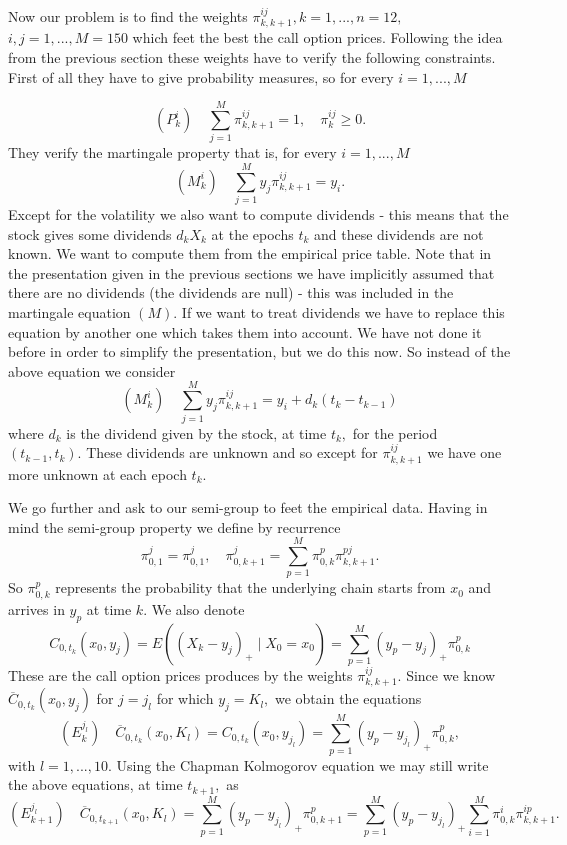 \documentclass[a4paper]{article}
\begin{document}
Now our problem is to find the weights $\pi _{k,k+1}^{ij},k=1,...,n=12,$ $%
i,j=1,...,M=150$ which feet the best the call option prices. Following the
idea from the previous section these weights have to verify the following
constraints. First of all they have to give probability measures, so for
every $i=1,...,M$

\[
(P_{k}^{i})\quad \sum_{j=1}^{M}\pi _{k,k+1}^{ij}=1,\quad \pi _{k}^{ij}\geq
0.
\]
They verify the martingale property that is, for every $i=1,...,M$%
\[
(M_{k}^{i})\quad \sum_{j=1}^{M}y_{j}\pi _{k,k+1}^{ij}=y_{i}.
\]
Except for the volatility we also want to compute dividends - this means
that the stock gives some dividends $d_{k}X_{k}$ at the epochs $t_{k}$ and
these dividends are not known. We want to compute them from the empirical
price table. Note that in the presentation given in the previous sections we
have implicitly assumed that there are no dividends (the dividends are null)
- this was included in the martingale equation $(M).$ If we want to treat
dividends we have to replace this equation by another one which takes them
into account. We have not done it before in order to simplify the
presentation, but we do this now. So instead of the above equation we
consider
\[
(M_{k}^{i})\quad \sum_{j=1}^{M}y_{j}\pi
_{k,k+1}^{ij}=y_{i}+d_{k}(t_{k}-t_{k-1})
\]
where $d_{k}$ is the dividend given by the stock, at time $t_{k},$ for the
period $(t_{k-1},t_{k}).$ These dividends are unknown and so except for $\pi
_{k,k+1}^{ij}$ we have one more unknown at each epoch $t_{k}.$

We go further and ask to our semi-group to feet the empirical data. Having in
mind the semi-group property we define by recurrence
\[
\pi _{0,1}^{j}=\pi _{0,1}^{j},\quad \pi _{0,k+1}^{j}=\sum_{p=1}^{M}\pi
_{0,k}^{p}\pi _{k,k+1}^{pj}.
\]
So $\pi _{0,k}^{p}$ represents the probability that the underlying chain
starts from $x_{0}$ and arrives in $y_{p}$ at time $k.$ We also denote
\[
C_{0,t_{k}}(x_{0},y_{j})=E((X_{k}-y_{j})_{+}\mid
X_{0}=x_{0})=\sum_{p=1}^{M}(y_{p}-y_{j})_{+}\pi _{0,k}^{p}
\]
These are the call option prices produces by the weights $\pi _{k,k+1}^{ij}.$
Since we know $\overline{C}_{0,t_{k}}(x_{0},y_{j})$ for $j=j_{l}$ for which $%
y_{j}=K_{l},$ we obtain the equations
\[
(E_{k}^{j_{l}})\quad \overline{C}%
_{0,t_{k}}(x_{0},K_{l})=C_{0,t_{k}}(x_{0},y_{j_{l}})=%
\sum_{p=1}^{M}(y_{p}-y_{j_{l}})_{+}\pi _{0,k}^{p},
\]
with $l=1,...,10.$ Using the Chapman Kolmogorov equation we may still write
the above equations, at time $t_{k+1},$ as
\[
(E_{k+1}^{j_{l}})\quad \overline{C}_{0,t_{k+1}}(x_{0},K_{l})=%
\sum_{p=1}^{M}(y_{p}-y_{j_{l}})_{+}\pi
_{0,k+1}^{p}=\sum_{p=1}^{M}(y_{p}-y_{j_{l}})_{+}\sum_{i=1}^{M}\pi
_{0,k}^{i}\pi _{k,k+1}^{ip}.
\]
\end{document}
